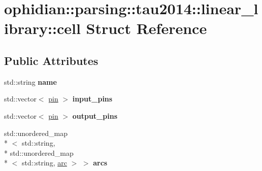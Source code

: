 \hypertarget{structophidian_1_1parsing_1_1tau2014_1_1linear__library_1_1cell}{\section{ophidian\-:\-:parsing\-:\-:tau2014\-:\-:linear\-\_\-library\-:\-:cell Struct Reference}
\label{structophidian_1_1parsing_1_1tau2014_1_1linear__library_1_1cell}
}
\subsection*{Public Attributes}
\begin{DoxyCompactItemize}
\item 
\hypertarget{structophidian_1_1parsing_1_1tau2014_1_1linear__library_1_1cell_a97c2ca99513f58c52b84ac0a8a7360ba}{std\-::string {\bfseries name}}\label{structophidian_1_1parsing_1_1tau2014_1_1linear__library_1_1cell_a97c2ca99513f58c52b84ac0a8a7360ba}

\item 
\hypertarget{structophidian_1_1parsing_1_1tau2014_1_1linear__library_1_1cell_ab1dcaf6bdf0b18ce6ff4c77d89678f5d}{std\-::vector$<$ \hyperlink{structophidian_1_1parsing_1_1tau2014_1_1linear__library_1_1pin}{pin} $>$ {\bfseries input\-\_\-pins}}\label{structophidian_1_1parsing_1_1tau2014_1_1linear__library_1_1cell_ab1dcaf6bdf0b18ce6ff4c77d89678f5d}

\item 
\hypertarget{structophidian_1_1parsing_1_1tau2014_1_1linear__library_1_1cell_abf8a8c6c3af0f761e44975496e848ef0}{std\-::vector$<$ \hyperlink{structophidian_1_1parsing_1_1tau2014_1_1linear__library_1_1pin}{pin} $>$ {\bfseries output\-\_\-pins}}\label{structophidian_1_1parsing_1_1tau2014_1_1linear__library_1_1cell_abf8a8c6c3af0f761e44975496e848ef0}

\item 
\hypertarget{structophidian_1_1parsing_1_1tau2014_1_1linear__library_1_1cell_af5edb9536299fe9b516ebafc6838cabd}{std\-::unordered\-\_\-map\\*
$<$ std\-::string, \\*
std\-::unordered\-\_\-map\\*
$<$ std\-::string, \hyperlink{structophidian_1_1parsing_1_1tau2014_1_1linear__library_1_1arc}{arc} $>$ $>$ {\bfseries arcs}}\label{structophidian_1_1parsing_1_1tau2014_1_1linear__library_1_1cell_af5edb9536299fe9b516ebafc6838cabd}


\end{DoxyCompactItemize}
